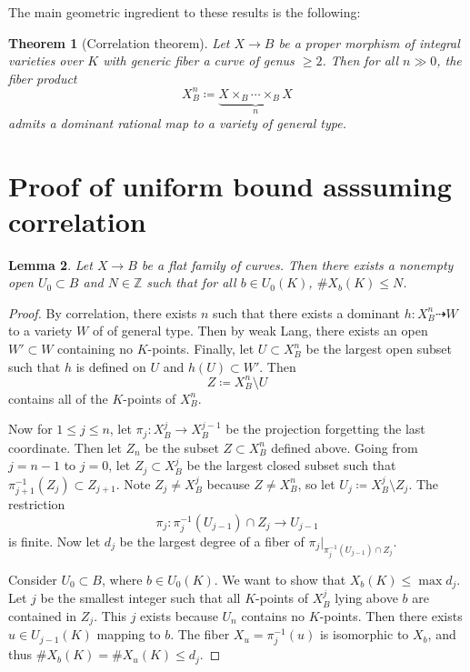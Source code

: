 \documentclass[leqno, openany]{memoir}
\newtheorem{thm}{Theorem}[section]
\newtheorem{lem}[thm]{Lemma}
\theoremstyle{definition}
\theoremstyle{remark}
\theoremstyle{plain}
\theoremstyle{definition}
\theoremstyle{remark}
\newcommand{\Z}{\mathbb{Z}}
\begin{document}
The main geometric ingredient to these results is the following:
\begin{thm}[Correlation theorem]
    Let $X \to B$ be a proper morphism of integral varieties over $K$ with generic fiber a curve of genus $\geq 2$. Then for all $n \gg 0$, the fiber product 
    \[ X_B^n \coloneqq \underbrace{X \times_B \cdots \times_B X}_{n} \]
    admits a dominant rational map to a variety of general type.
\end{thm}

\section{Proof of uniform bound asssuming correlation}

\begin{lem}
    Let $X \to B$ be a flat family of curves. Then there exists a nonempty open $U_0 \subset B$ and $N \in \Z$ such that for all $b \in U_0(K)$, $\# X_b(K) \leq N$.
\end{lem}

\begin{proof}
    By correlation, there exists $n$ such that there exists a dominant $h \colon X_B^n \dashrightarrow W$ to a variety $W$ of of general type. Then by weak Lang, there exists an open $W' \subset W$ containing no $K$-points. Finally, let $U \subset X_B^n$ be the largest open subset such that $h$ is defined on $U$ and $h(U) \subset W'$. Then
    \[ Z \coloneqq X_B^n \setminus U \]
    contains all of the $K$-points of $X_B^n$.

    Now for $1 \leq j \leq n$, let $\pi_j \colon X_B^j \to X_B^{j-1}$ be the projection forgetting the last coordinate. Then let $Z_n$ be the subset $Z \subset X_B^n$ defined above. Going from $j = n-1$ to $j = 0$, let $Z_j \subset X_B^j$ be the largest closed subset such that $\pi_{j+1}^{-1}(Z_j) \subset Z_{j+1}$. Note $Z_j \neq X_B^j$ because $Z \neq X_B^n$, so let $U_j \coloneqq X_B^j \setminus Z_j$. The restriction 
    \[ \pi_j \colon \pi_j^{-1}(U_{j-1}) \cap Z_j \to U_{j-1} \] 
    is finite. Now let $d_j$ be the largest degree of a fiber of $\pi_j |_{\pi_j^{-1}(U_{j-1}) \cap Z_j}$.

    Consider $U_0 \subset B$, where $b \in U_0(K)$. We want to show that $X_b(K) \leq \max d_j$. Let $j$ be the smallest integer such that all $K$-points of $X_B^j$ lying above $b$ are contained in $Z_j$. This $j$ exists because $U_n$ contains no $K$-points. Then there exists $u \in U_{j-1}(K)$ mapping to $b$. The fiber $X_u = \pi_j^{-1}(u)$ is isomorphic to $X_b$, and thus $\# X_b(K) = \# X_u(K) \leq d_j$.
\end{proof}
\end{document}
